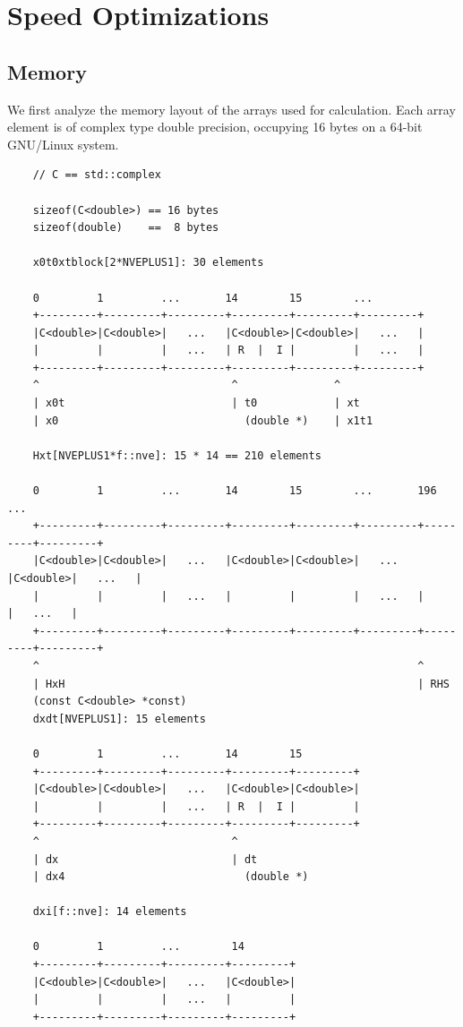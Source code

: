 \section{Speed Optimizations}

\subsection{Memory}
We first analyze the memory layout of the arrays used for calculation. Each
array element is of complex type double precision, occupying 16 bytes on a
64-bit GNU/Linux system.
\tiny\begin{verbatim}
    // C == std::complex

    sizeof(C<double>) == 16 bytes
    sizeof(double)    ==  8 bytes

    x0t0xtblock[2*NVEPLUS1]: 30 elements

    0         1         ...       14        15        ...
    +---------+---------+---------+---------+---------+---------+
    |C<double>|C<double>|   ...   |C<double>|C<double>|   ...   |
    |         |         |   ...   | R  |  I |         |   ...   |
    +---------+---------+---------+---------+---------+---------+
    ^                              ^               ^
    | x0t                          | t0            | xt
    | x0                             (double *)    | x1t1

    Hxt[NVEPLUS1*f::nve]: 15 * 14 == 210 elements

    0         1         ...       14        15        ...       196       ...
    +---------+---------+---------+---------+---------+---------+---------+---------+
    |C<double>|C<double>|   ...   |C<double>|C<double>|   ...   |C<double>|   ...   |
    |         |         |   ...   |         |         |   ...   |         |   ...   |
    +---------+---------+---------+---------+---------+---------+---------+---------+
    ^                                                           ^
    | HxH                                                       | RHS
    (const C<double> *const)
    dxdt[NVEPLUS1]: 15 elements

    0         1         ...       14        15
    +---------+---------+---------+---------+---------+
    |C<double>|C<double>|   ...   |C<double>|C<double>|
    |         |         |   ...   | R  |  I |         |
    +---------+---------+---------+---------+---------+
    ^                              ^
    | dx                           | dt
    | dx4                            (double *)

    dxi[f::nve]: 14 elements

    0         1         ...        14
    +---------+---------+---------+---------+
    |C<double>|C<double>|   ...   |C<double>|
    |         |         |   ...   |         |
    +---------+---------+---------+---------+

\end{verbatim}
\normalsize

